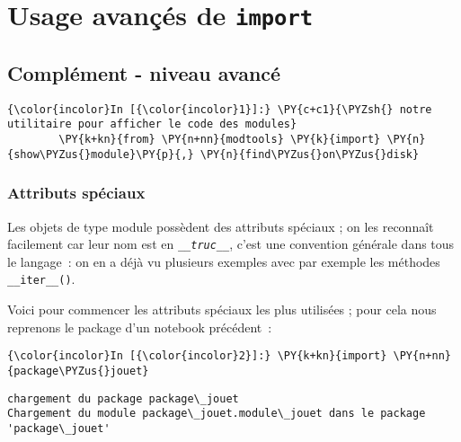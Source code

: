     
    
    
    

    

    \hypertarget{usage-avanuxe7uxe9s-de-import}{%
\section{\texorpdfstring{Usage avançés de
\texttt{import}}{Usage avançés de import}}\label{usage-avanuxe7uxe9s-de-import}}

    \hypertarget{compluxe9ment---niveau-avancuxe9}{%
\subsection{Complément - niveau
avancé}\label{compluxe9ment---niveau-avancuxe9}}

    \begin{Verbatim}[commandchars=\\\{\}]
{\color{incolor}In [{\color{incolor}1}]:} \PY{c+c1}{\PYZsh{} notre utilitaire pour afficher le code des modules}
        \PY{k+kn}{from} \PY{n+nn}{modtools} \PY{k}{import} \PY{n}{show\PYZus{}module}\PY{p}{,} \PY{n}{find\PYZus{}on\PYZus{}disk}
\end{Verbatim}


    \hypertarget{attributs-spuxe9ciaux}{%
\subsubsection{Attributs spéciaux}\label{attributs-spuxe9ciaux}}

    Les objets de type module possèdent des attributs spéciaux ; on les
reconnaît facilement car leur nom est en \emph{\texttt{\_\_truc\_\_}},
c'est une convention générale dans tous le langage~: on en a déjà vu
plusieurs exemples avec par exemple les méthodes
\texttt{\_\_iter\_\_()}.

    Voici pour commencer les attributs spéciaux les plus utilisées ; pour
cela nous reprenons le package d'un notebook précédent~:

    \begin{Verbatim}[commandchars=\\\{\}]
{\color{incolor}In [{\color{incolor}2}]:} \PY{k+kn}{import} \PY{n+nn}{package\PYZus{}jouet}
\end{Verbatim}


    \begin{Verbatim}[commandchars=\\\{\}]
chargement du package package\_jouet
Chargement du module package\_jouet.module\_jouet dans le package 'package\_jouet'

    \end{Verbatim}

